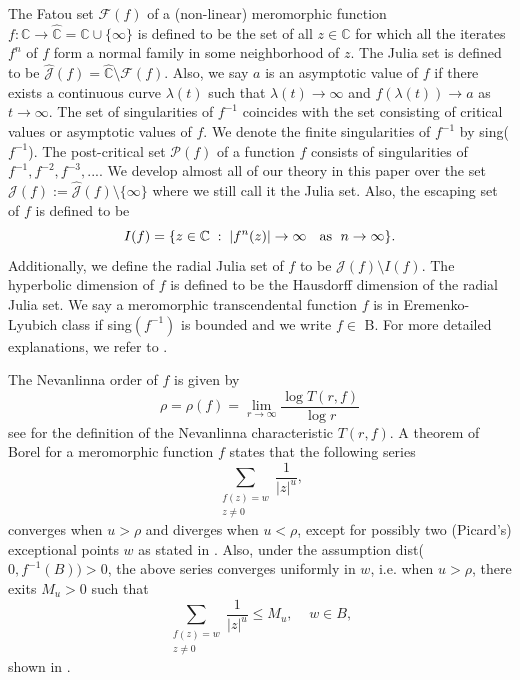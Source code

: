 \documentclass[12pt,reqno]{amsart}
\begin{document}
\noindent The Fatou set $\mathcal{F}(f)$ of a (non-linear) meromorphic function $f: \mathbb{C} \to \hat{\mathbb{C}}=\mathbb{C}\cup\{\infty\}$ is defined to be the set of all $z \in \mathbb{C}$ for which all the iterates $f^n$ of $f$ form a normal family in some neighborhood of $z$. The Julia set is defined to be $\hat{\mathcal{J}}(f)= \hat{\mathbb{C}}\setminus\mathcal{F}(f)$. Also, we say $a$ is an asymptotic value of $f$ if there exists a continuous curve $\lambda(t)$ such that $\lambda(t) \to \infty$ and $f(\lambda(t))\to a$ as $t \to \infty$. The set of singularities of $f^{-1}$ coincides with the set consisting of critical values or asymptotic values of $f$. We denote the finite singularities of $f^{-1}$ by sing($f^{-1}$).  The post-critical set $\mathcal{P}(f)$ of a function $f$ consists of singularities of $f^{-1}, f^{-2}, f^{-3}, ...$. We develop almost all of our theory in this paper over the set $\mathcal{J}(f):=\hat{\mathcal{J}}(f) \setminus \{\infty\}$ where we still call it the Julia set. Also, the escaping set of $f$ is defined to be
$$I(f)=\{z\in \mathbb{C} \; : \; |f^n(z)| \to \infty \text{ \; as\; } n\to \infty\}.$$
Additionally, we define the radial Julia set of $f$ to be $\mathcal{J}(f) \setminus I(f)$. The hyperbolic dimension of $f$ is defined to be the Hausdorff dimension of the radial Julia set. We say a meromorphic transcendental function $f$ is in Eremenko-Lyubich class if sing$(f^{-1})$ is bounded and we write $f \in $ B. For more detailed explanations, we refer to \citep[ch. 13]{MeromorphicDynamicsII}. 

\noindent The Nevanlinna order of $f$ is given by
$$\rho=\rho(f)=\lim_{r \to \infty}\dfrac{\log T(r,f)}{\log r}$$
see \citep[p. 13]{Urbanski-Mayer} for the definition of the Nevanlinna characteristic $ T(r,f)$. A theorem of Borel for a meromorphic function $f$ states that the following series 
$$\sum_{\substack{f(z)=w \\ z\neq 0}}\dfrac{1}{|z|^{u}},$$
converges when $u>\rho$ and diverges when $u<\rho$, except for possibly two (Picard's) exceptional points $w$ as stated in \citep[97]{Tsuji}. Also, under the assumption dist($0,f^{-1}(B))>0$, the above series converges uniformly in $w$, i.e. when $u>\rho$, there exits $M_u>0$ such that 
\begin{equation}\label{Borel theorem}
    \sum_{\substack{f(z)=w \\ z\neq 0}}\dfrac{1}{|z|^{u}} \leq M_u, \; \; \; \; w \in B,
\end{equation}
shown in \citep[p. 16]{Urbanski-Mayer}. 
\end{document}
